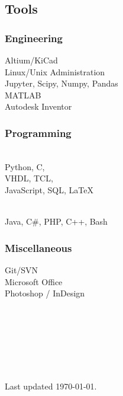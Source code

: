\documentclass[]{resume}
\begin{document}
\begin{facts}
\subsection{Tools}

\subsubsection{Engineering}
Altium/KiCad\\
Linux/Unix Administration\\
Jupyter, Scipy, Numpy, Pandas\\
MATLAB\\
Autodesk Inventor
\sectionsep

\subsubsection{Programming}
\\
Python, C,\\
VHDL, TCL,\\
JavaScript, SQL, LaTeX
\sectionsep

\\
Java, C\#, PHP, C++, Bash
\sectionsep

\subsubsection{Miscellaneous}
Git/SVN\\
Microsoft Office\\
Photoshop / InDesign\\
\\
\\
\\
\\
\\
\\
\\
Last updated \today.

\end{facts}
\end{document}
